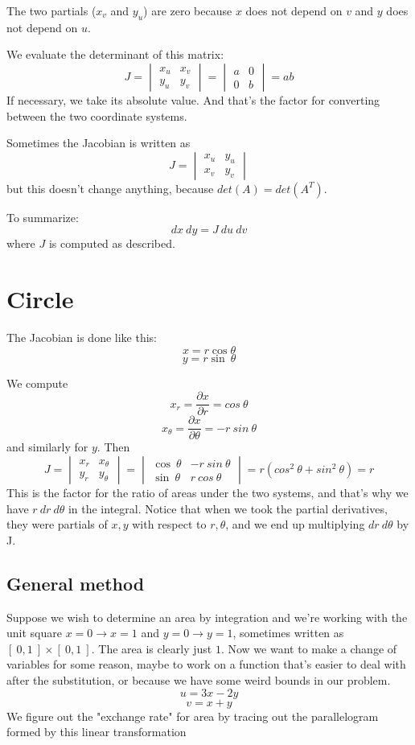 \documentclass[11pt, oneside]{article}
\begin{document}
The two partials ($x_v$ and $y_u$) are zero because $x$ does not depend on $v$ and  $y$ does not depend on $u$.

We evaluate the determinant of this matrix:
\[ J = 
\begin{vmatrix}
x_u & x_v \\
y_u & y_v 
\end{vmatrix} =
\begin{vmatrix}
a & 0 \\
0 & b
\end{vmatrix} =ab
\]
If necessary, we take its absolute value.  And that's the factor for converting between the two coordinate systems.

Sometimes the Jacobian is written as
\[ J = 
\begin{vmatrix}
x_u & y_u \\
x_v & y_v 
\end{vmatrix}
\]
but this doesn't change anything, because $det(A) = det(A^T)$.

To summarize:
\[ dx \ dy = J \ du \ dv \]
where
$J$ is computed as described.

\section*{Circle}
The Jacobian is done like this: 
\[ x = r \cos \theta \]
\[ y = r \sin\ \theta \]

We compute
\[ x_r = \frac{\partial x}{\partial r} = cos \ \theta \]
\[ x_{\theta} = \frac{\partial x}{\partial \theta} = -r \ sin \ \theta \]
and similarly for $y$.  Then
\[ J = 
\begin{vmatrix}
x_r & x_{\theta} \\
y_r & y_{\theta} 
\end{vmatrix} =
\begin{vmatrix}
\cos\ \theta & -r \ sin\ \theta \\
\sin\ \theta & r \ cos\ \theta 
\end{vmatrix} = r (cos^2\ \theta + sin^2\ \theta) = r
\]
This is the factor for the ratio of areas under the two systems, and that's why we have $r\ dr \ d\theta$ in the integral.  Notice that when we took the partial derivatives, they were partials of $x,y$ with respect to $r,\theta$, and we end up multiplying $dr \ d\theta$ by J.

\subsection*{General method}
Suppose we wish to determine an area by integration and we're working with the unit square $x=0 \to x=1$ and $y=0 \to y=1$, sometimes written as $[\ 0,1\ ] \times [\ 0,1\ ]$.  The area is clearly just $1$.  Now we want to make a change of variables for some reason, maybe to work on a function that's easier to deal with after the substitution, or because we have some weird bounds in our problem.
\[ u = 3x-2y \]
\[ v = x + y \]
We figure out the "exchange rate" for area by tracing out the parallelogram formed by this linear transformation
\end{document}
